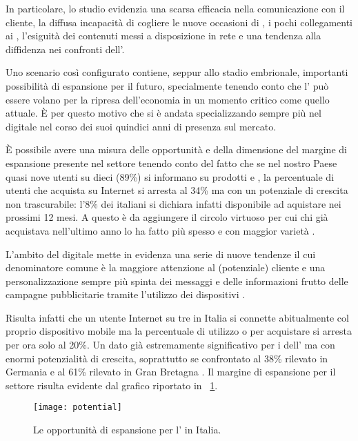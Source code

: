 In particolare, lo studio evidenzia una scarsa efficacia nella comunicazione con il cliente, la diffusa incapacità di cogliere le nuove occasioni di \bsn, i pochi collegamenti ai , l'esiguità dei contenuti messi a disposizione in rete e una tendenza alla diffidenza nei confronti dell'.

Uno scenario così configurato contiene, seppur allo stadio embrionale, importanti possibilità di espansione per il futuro, specialmente tenendo conto che l' può essere volano per la ripresa dell'economia in un momento critico come quello attuale. È per questo motivo che \customer si è andata specializzando sempre più nel \mktg digitale nel corso dei suoi quindici anni di presenza sul mercato.

È possibile avere una misura delle opportunità e della dimensione del margine di espansione presente nel settore tenendo conto del fatto che se nel nostro Paese quasi nove utenti su dieci (89\%) si informano  su prodotti e , la percentuale di utenti che acquista su Internet si  arresta al 34\% ma con un potenziale di crescita non trascurabile: l'8\% dei  italiani si dichiara infatti disponibile ad aquistare  nei prossimi 12 mesi. A questo è da aggiungere il circolo virtuoso per
cui chi già acquistava nell’ultimo anno lo ha fatto più spesso e con maggior varietà \cite[\textit{pag.~3}]{contactlab:ecommerce}.

L'ambito del \mktg digitale mette in evidenza una serie di nuove tendenze il cui denominatore comune è la maggiore attenzione al (potenziale) cliente e una personalizzazione sempre più spinta dei messaggi e delle informazioni frutto delle campagne pubblicitarie tramite l'utilizzo dei dispositivi .

Risulta infatti che un utente Internet su tre in Italia si connette abitualmente col proprio dispositivo mobile ma la percentuale di utilizzo  o  per acquistare  si arresta per ora solo al 20\%. Un dato già estremamente significativo per i  dell' ma con enormi potenzialità di crescita, soprattutto se confrontato al 38\% rilevato in Germania e al 61\% rilevato in Gran Bretagna \cite{contactlab:ecommerce}. Il margine di espansione per il settore risulta evidente dal grafico riportato in \figurename~\ref{fig:potential}.

\begin{figure}[H]
  \centering
  \caption{Le opportunità di espansione per l' in Italia.}
  \label{fig:potential}
  \texttt{[image: potential]}
\end{figure}

